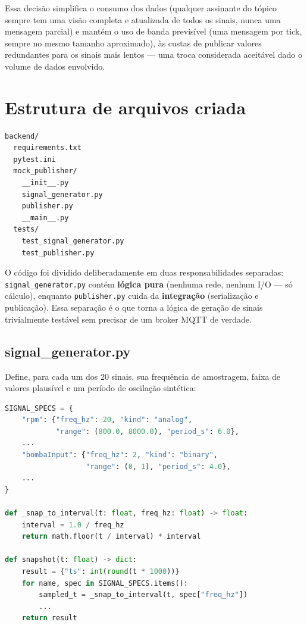\documentclass[11pt,a4paper]{article}
\begin{document}
Essa decisão simplifica o consumo dos dados (qualquer assinante do tópico sempre tem uma visão completa e atualizada de todos os sinais, nunca uma mensagem parcial) e mantém o uso de banda previsível (uma mensagem por tick, sempre no mesmo tamanho aproximado), às custas de publicar valores redundantes para os sinais mais lentos --- uma troca considerada aceitável dado o volume de dados envolvido.

\section{Estrutura de arquivos criada}

\begin{lstlisting}[language=bash,caption={Estrutura do diretório backend/}]
backend/
  requirements.txt
  pytest.ini
  mock_publisher/
    __init__.py
    signal_generator.py
    publisher.py
    __main__.py
  tests/
    test_signal_generator.py
    test_publisher.py
\end{lstlisting}

O código foi dividido deliberadamente em duas responsabilidades separadas: \texttt{signal\_generator.py} contém \textbf{lógica pura} (nenhuma rede, nenhum I/O --- só cálculo), enquanto \texttt{publisher.py} cuida da \textbf{integração} (serialização e publicação). Essa separação é o que torna a lógica de geração de sinais trivialmente testável sem precisar de um broker MQTT de verdade.

\subsection{signal\_generator.py}

Define, para cada um dos 20 sinais, sua frequência de amostragem, faixa de valores plausível e um período de oscilação sintética:

\begin{lstlisting}[language=Python,caption={Trecho de mock\_publisher/signal\_generator.py}]
SIGNAL_SPECS = {
    "rpm": {"freq_hz": 20, "kind": "analog",
            "range": (800.0, 8000.0), "period_s": 6.0},
    ...
    "bombaInput": {"freq_hz": 2, "kind": "binary",
                   "range": (0, 1), "period_s": 4.0},
    ...
}

def _snap_to_interval(t: float, freq_hz: float) -> float:
    interval = 1.0 / freq_hz
    return math.floor(t / interval) * interval

def snapshot(t: float) -> dict:
    result = {"ts": int(round(t * 1000))}
    for name, spec in SIGNAL_SPECS.items():
        sampled_t = _snap_to_interval(t, spec["freq_hz"])
        ...
    return result
\end{lstlisting}
\end{document}
